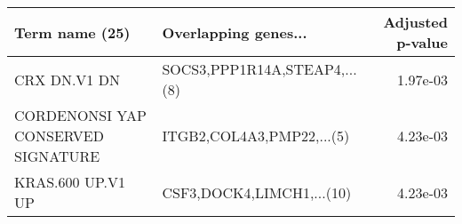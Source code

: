 \begin{tabular}{llr}
\toprule
                    Term name (25) &         Overlapping genes... &  Adjusted p-value \\
\midrule
                      CRX DN.V1 DN & SOCS3,PPP1R14A,STEAP4,...(8) &          1.97e-03 \\
CORDENONSI YAP CONSERVED SIGNATURE &    ITGB2,COL4A3,PMP22,...(5) &          4.23e-03 \\
                 KRAS.600 UP.V1 UP &    CSF3,DOCK4,LIMCH1,...(10) &          4.23e-03 \\
\bottomrule
\end{tabular}
